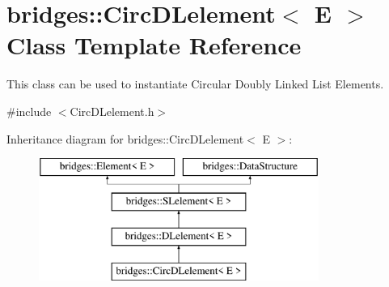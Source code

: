 \hypertarget{classbridges_1_1_circ_d_lelement}{}\section{bridges\+::Circ\+D\+Lelement$<$ E $>$ Class Template Reference}
\label{classbridges_1_1_circ_d_lelement}


This class can be used to instantiate Circular Doubly Linked List Elements.  




{\ttfamily \#include $<$Circ\+D\+Lelement.\+h$>$}

Inheritance diagram for bridges\+::Circ\+D\+Lelement$<$ E $>$\+:\begin{figure}[H]
\begin{center}
\leavevmode
\includegraphics[height=4.000000cm]{classbridges_1_1_circ_d_lelement}
\end{center}
\end{figure}

